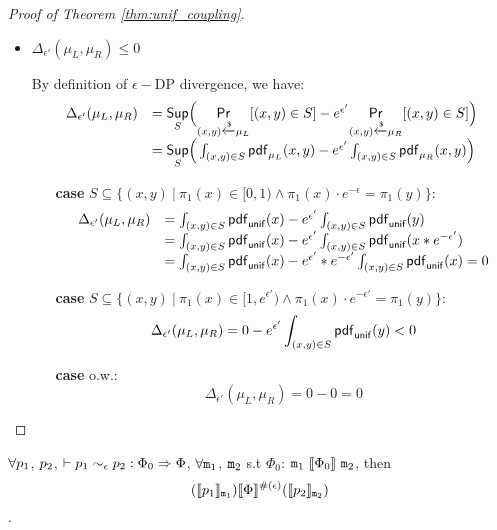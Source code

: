 \documentclass[a4paper,11pt]{article}
\begin{document}
\begin{proof}[Proof of Theorem \ref{thm:unif_coupling}]
\begin{itemize}
	\item $\Delta_{\epsilon'}(\mu_L, \mu_R) \leq 0$

	By definition of $\epsilon-$DP divergence, we have:
	 \[
	 \begin{array}{ll}
	 \Delta_{\epsilon'}(\mu_L, \mu_R) 
	 & = \underset{S}{\mathsf{Sup}}
	 \Big(
	 \underset{(x,y) \xleftarrow{\$} \mu_L}{\mathsf{Pr}}[(x,y) \in S] - e^{\epsilon'} \underset{(x,y) \xleftarrow{\$} \mu_R}{\mathsf{Pr}}[(x,y) \in S]
	 \Big) \\
	 & =\underset{S}{\mathsf{Sup}}
	 \Big(
	 \int_{(x,y) \in S} \mathsf{pdf}_{\mu_L}(x, y) - e^{\epsilon'} \int_{(x,y) \in S} \mathsf{pdf}_{\mu_R}(x, y)
	 \Big)	 
	 \end{array}
	 \]
	 \begin{itemize}
	 	\item[{\bf case}]
	 	$S \subseteq \{(x, y) ~|~ 
	 	\pi_1(x) \in [0, 1) \land \pi_1(x) \cdot e^{-\epsilon} 
	 	= \pi_1(y)\}$:
		\[
		 \begin{array}{ll}
		 \Delta_{\epsilon'}(\mu_L, \mu_R) 
		 & = 
		 \int_{(x,y) \in S} \mathsf{pdf}_{\mathsf{unif}}(x) - e^{\epsilon'} \int_{(x,y) \in S} \mathsf{pdf}_{\mathsf{unif}}(y)\\
		 & = 
		 \int_{(x,y) \in S} \mathsf{pdf}_{\mathsf{unif}}(x) - e^{\epsilon'} \int_{(x,y) \in S} \mathsf{pdf}_{\mathsf{unif}}(x * e^{-\epsilon'})\\ 
		 & = 
		 \int_{(x,y) \in S} \mathsf{pdf}_{\mathsf{unif}}(x) - e^{\epsilon'}* e^{-\epsilon'} \int_{(x,y) \in S} \mathsf{pdf}_{\mathsf{unif}}(x) 
		 = 0 
		 \end{array}
		 \]
	 	\item[{\bf case}] $S \subseteq \{(x, y) 
	 	~|~ \pi_1(x) \in [1, e^{\epsilon'}) 
	 	\land \pi_1(x) \cdot e^{-\epsilon'} = \pi_1(y)\}$:
		 \[
		 \Delta_{\epsilon'}(\mu_L, \mu_R) 
		 = 
		 0 - e^{\epsilon'} \int_{(x,y) \in S} \mathsf{pdf}_{\mathsf{unif}}(y) <0
		 \]
	 	\item[{\bf case}] o.w.:
		 \[
		 \Delta_{\epsilon'}(\mu_L, \mu_R) = 0 - 0 =  0 
		 \]	 	

	 \end{itemize}

\end{itemize}
\end{proof}
%
%
%
%
%
%
\clearpage
\begin{thm}[Soundness]
 $\forall p_1$, $p_2$,  $ \vdash p_1	
\sim_{\epsilon} 
p_2 :
\Phi_0 \Rightarrow \Phi $,    $\forall \mathtt{m}_1$, $\mathtt{m}_2$ 
s.t $\Phi_0$: 
$\mathtt{m}_1 ~ \llbracket \Phi_0 \rrbracket ~ \mathtt{m}_2$,
then
$$ 
(\llbracket p_1 \rrbracket_{\mathtt{m}_1})  
\llbracket \Phi \rrbracket^{\#(\epsilon)} 
(\llbracket p_2 \rrbracket_{\mathtt{m}_2}) 
$$.
\end{thm}
\end{document}
